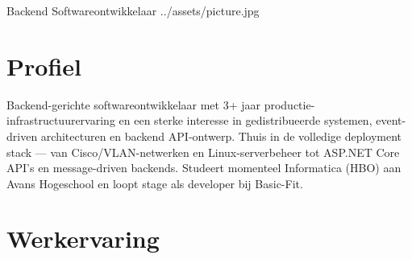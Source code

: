 \documentclass[a4paper,10pt]{article}
\begin{document}
  {Backend Softwareontwikkelaar}
  {\csep
   \csep
   }
  {\csep
   \csep
   }
  {../assets/picture.jpg}

\section{Profiel}

Backend-gerichte softwareontwikkelaar met 3+ jaar productie-infrastructuurervaring en een sterke interesse in gedistribueerde systemen, event-driven architecturen en backend API-ontwerp.
Thuis in de volledige deployment stack --- van Cisco/VLAN-netwerken en Linux-serverbeheer tot ASP.NET Core API's en message-driven backends.
Studeert momenteel Informatica (HBO) aan Avans Hogeschool en loopt stage als developer bij Basic-Fit.

\section{Werkervaring}
\end{document}
